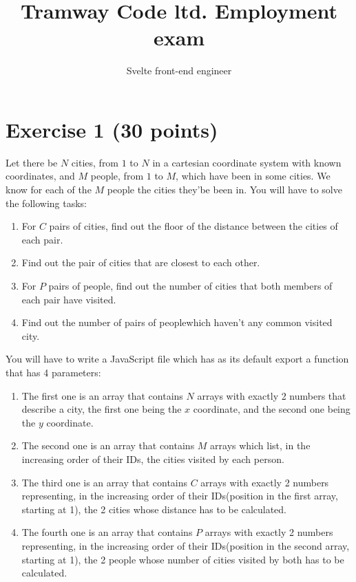 \documentclass{article}
\title{Tramway Code ltd. Employment exam}
\author{Svelte front-end engineer}
\begin{document}
\maketitle


\section*{Exercise 1 (30 points)}
Let there be $N$ cities, from $1$ to $N$ in a cartesian coordinate system with known coordinates, and $M$ people, from $1$ to $M$, which have been in some cities.
We know for each of the $M$ people the cities they'be been in.
You will have to solve the following tasks:
\begin{enumerate}[label=\alph*)]
	\item For $C$ pairs of cities, find out the floor of the distance between the cities of each pair.
	\item Find out the pair of cities that are closest to each other.
	\item For $P$ pairs of people, find out the number of cities that both members of each pair have visited.
	\item Find out the number of pairs of people\footnotemark[1] which haven't any common visited city.
\end{enumerate}

You will have to write a JavaScript file which has as its default export a function that has 4 parameters:
\begin{enumerate}
	\item The first one is an array that contains $N$ arrays with exactly 2 numbers that describe a city, the first one being the $x$ coordinate, and the second one being the $y$ coordinate.
	\item The second one is an array that contains $M$ arrays which list, in the increasing order of their IDs\footnotemark[2], the cities visited by each person.
	\item The third one is an array that contains $C$ arrays with exactly 2 numbers representing, in the increasing order of their IDs\footnotemark[2] (position in the first array, starting at 1), the 2 cities whose distance has to be calculated.
	\item The fourth one is an array that contains $P$ arrays with exactly 2 numbers representing, in the increasing order of their IDs\footnotemark[3] (position in the second array, starting at 1), the 2 people whose number of cities visited by both has to be calculated.
\end{enumerate}
\end{document}
